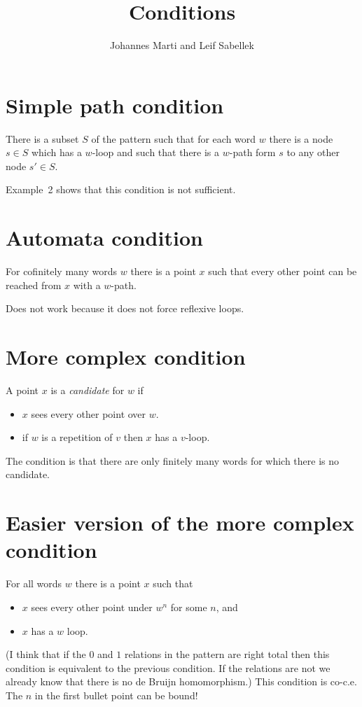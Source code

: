 \documentclass[a4paper]{article}
\title{Conditions}
\author{Johannes Marti and Leif Sabellek}
\begin{document}
\maketitle

\section{Simple path condition}

There is a subset $S$ of the pattern such that for each word $w$ there
is a node $s \in S$ which has a $w$-loop and such that there is a
$w$-path form $s$ to any other node $s' \in S$.

Example~2 shows that this condition is not sufficient.


\section{Automata condition}

For cofinitely many words $w$ there is a point $x$ such that every other
point can be reached from $x$ with a $w$-path.

Does not work because it does not force reflexive loops.


\section{More complex condition}

A point $x$ is a \emph{candidate} for $w$ if
\begin{itemize}
 \item $x$ sees every other point over $w$.
 \item if $w$ is a repetition of $v$ then $x$ has a $v$-loop.
\end{itemize}

The condition is that there are only finitely many words for which there
is no candidate.


\section{Easier version of the more complex condition}

For all words $w$ there is a point $x$ such that
\begin{itemize}
 \item $x$ sees every other point under $w^n$ for some $n$, and
 \item $x$ has a $w$ loop.
\end{itemize}

(I think that if the $0$ and $1$ relations in the pattern are right
total then this condition is equivalent to the previous condition. If
the relations are not we already know that there is no de Bruijn
homomorphism.)
This condition is co-c.e. The $n$ in the first bullet point can
be bound!
\end{document}
